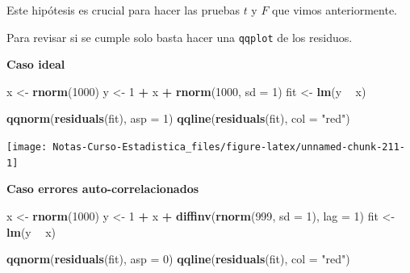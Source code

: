 \documentclass[
  12pt,
]{book}
\newenvironment{Shaded}{\begin{snugshade}}{\end{snugshade}}
\newcommand{\DataTypeTok}[1]{\textcolor[rgb]{0.13,0.29,0.53}{#1}}
\newcommand{\DecValTok}[1]{\textcolor[rgb]{0.00,0.00,0.81}{#1}}
\newcommand{\KeywordTok}[1]{\textcolor[rgb]{0.13,0.29,0.53}{\textbf{#1}}}
\newcommand{\NormalTok}[1]{#1}
\newcommand{\OperatorTok}[1]{\textcolor[rgb]{0.81,0.36,0.00}{\textbf{#1}}}
\newcommand{\StringTok}[1]{\textcolor[rgb]{0.31,0.60,0.02}{#1}}
\theoremstyle{definition}
\theoremstyle{definition}
\theoremstyle{definition}
\theoremstyle{remark}
\begin{document}
Este hipótesis es crucial para hacer las pruebas \(t\) y \(F\) que vimos anteriormente.

Para revisar si se cumple solo basta hacer una \texttt{qqplot} de los residuos.

\textbf{Caso ideal}

\begin{Shaded}
\begin{Highlighting}[]
\NormalTok{x <-}\StringTok{ }\KeywordTok{rnorm}\NormalTok{(}\DecValTok{1000}\NormalTok{)}
\NormalTok{y <-}\StringTok{ }\DecValTok{1} \OperatorTok{+}\StringTok{ }\NormalTok{x }\OperatorTok{+}\StringTok{ }\KeywordTok{rnorm}\NormalTok{(}\DecValTok{1000}\NormalTok{, }\DataTypeTok{sd =} \DecValTok{1}\NormalTok{)}
\NormalTok{fit <-}\StringTok{ }\KeywordTok{lm}\NormalTok{(y }\OperatorTok{~}\StringTok{ }\NormalTok{x)}
\end{Highlighting}
\end{Shaded}

\begin{Shaded}
\begin{Highlighting}[]
\KeywordTok{qqnorm}\NormalTok{(}\KeywordTok{residuals}\NormalTok{(fit), }\DataTypeTok{asp =} \DecValTok{1}\NormalTok{)}
\KeywordTok{qqline}\NormalTok{(}\KeywordTok{residuals}\NormalTok{(fit), }\DataTypeTok{col =} \StringTok{"red"}\NormalTok{)}
\end{Highlighting}
\end{Shaded}

\begin{center}\texttt{[image: Notas-Curso-Estadistica\_files/figure-latex/unnamed-chunk-211-1]} \end{center}

\textbf{Caso errores auto-correlacionados}

\begin{Shaded}
\begin{Highlighting}[]
\NormalTok{x <-}\StringTok{ }\KeywordTok{rnorm}\NormalTok{(}\DecValTok{1000}\NormalTok{)}
\NormalTok{y <-}\StringTok{ }\DecValTok{1} \OperatorTok{+}\StringTok{ }\NormalTok{x }\OperatorTok{+}\StringTok{ }\KeywordTok{diffinv}\NormalTok{(}\KeywordTok{rnorm}\NormalTok{(}\DecValTok{999}\NormalTok{, }\DataTypeTok{sd =} \DecValTok{1}\NormalTok{), }\DataTypeTok{lag =} \DecValTok{1}\NormalTok{)}
\NormalTok{fit <-}\StringTok{ }\KeywordTok{lm}\NormalTok{(y }\OperatorTok{~}\StringTok{ }\NormalTok{x)}
\end{Highlighting}
\end{Shaded}

\begin{Shaded}
\begin{Highlighting}[]
\KeywordTok{qqnorm}\NormalTok{(}\KeywordTok{residuals}\NormalTok{(fit), }\DataTypeTok{asp =} \DecValTok{0}\NormalTok{)}
\KeywordTok{qqline}\NormalTok{(}\KeywordTok{residuals}\NormalTok{(fit), }\DataTypeTok{col =} \StringTok{"red"}\NormalTok{)}
\end{Highlighting}
\end{Shaded}
\end{document}
